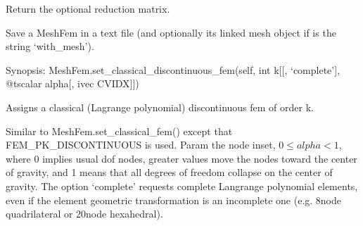 \documentclass[a4paper,11pt,english]{sphinxmanual}
\begin{document}
\begin{fulllineitems}
\begin{fulllineitems}
\end{fulllineitems}


\begin{fulllineitems}
\label{\detokenize{python/cmdref_MeshFem:getfem.MeshFem.reduction_matrix}}
Return the optional reduction matrix.

\end{fulllineitems}


\begin{fulllineitems}
\label{\detokenize{python/cmdref_MeshFem:getfem.MeshFem.save}}
Save a MeshFem in a text file (and optionally its linked mesh object
if  is the string ‘with\_mesh’).

\end{fulllineitems}


\begin{fulllineitems}
\label{\detokenize{python/cmdref_MeshFem:getfem.MeshFem.set_classical_discontinuous_fem}}
Synopsis: MeshFem.set\_classical\_discontinuous\_fem(self, int k{[}{[}, ‘complete’{]}, @tscalar alpha{[}, ivec CVIDX{]}{]})

Assigns a classical (Lagrange polynomial) discontinuous fem of order k.

Similar to MeshFem.set\_classical\_fem() except that
FEM\_PK\_DISCONTINUOUS is used. Param  the node inset,
\(0 \leq alpha < 1\), where 0 implies usual dof nodes, greater values
move the nodes toward the center of gravity, and 1 means that all
degrees of freedom collapse on the center of gravity.
The option ‘complete’ requests complete Langrange polynomial elements,
even if the element geometric transformation is an incomplete one
(e.g. 8\sphinxhyphen{}node quadrilateral or 20\sphinxhyphen{}node hexahedral).


\end{fulllineitems}
\end{fulllineitems}
\end{document}
